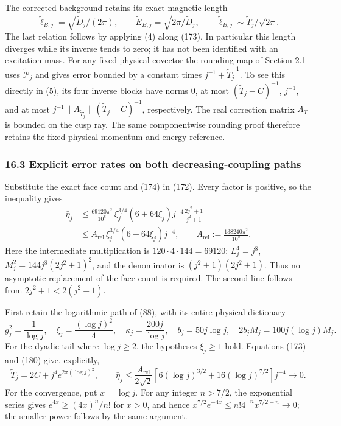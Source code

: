 \documentclass[
  11pt,
]{article}
\begin{document}
The corrected background retains its exact magnetic length \[
 \widetilde\ell_{B,j}=\sqrt{\widetilde D_j/(2\pi)},\qquad
 \widetilde E_{B,j}=\sqrt{2\pi/\widetilde D_j},\qquad
 \widetilde\ell_{B,j}\sim\widetilde T_j/\sqrt{2\pi}.
 \tag{179}
\] The last relation follows by applying (4) along (173). In particular
this length diverges while its inverse tends to zero; it has not been
identified with an excitation mass. For any fixed physical covector the
rounding map of Section 2.1 uses \(\widetilde{\mathcal P}_j\) and gives
error bounded by a constant times \(j^{-1}+\widetilde T_j^{-1}\). To see
this directly in (5), its four inverse blocks have norms \(0\), at most
\((\widetilde T_j-C)^{-1}\), \(j^{-1}\), and at most
\(j^{-1}\|A_{\widetilde T_j}\|(\widetilde T_j-C)^{-1}\), respectively.
The real correction matrix \(A_T\) is bounded on the cusp ray. The same
componentwise rounding proof therefore retains the fixed physical
momentum and energy reference.

\subsubsection{16.3 Explicit error rates on both decreasing-coupling
paths}\label{explicit-error-rates-on-both-decreasing-coupling-paths}

Substitute the exact face count and (174) in (172). Every factor is
positive, so the inequality gives \[
 \begin{split}
 \bar\eta_j
 &\le\frac{69120\pi^2}{10^8}\,
       \xi_j^{3/4}(6+64\xi_j)j^{-4}
       \frac{2j^2+1}{j^2+1}\\
 &\le A_{\mathrm{rel}}\,
       \xi_j^{3/4}(6+64\xi_j)j^{-4},\qquad
 A_{\mathrm{rel}}:=\frac{138240\pi^2}{10^8}.
 \end{split}
 \tag{180}
\] Here the intermediate multiplication is \(120\cdot4\cdot144=69120\):
\(L_j^4=j^8\), \(M_j^2=144j^8(2j^2+1)^2\), and the denominator is
\((j^2+1)(2j^2+1)\). Thus no asymptotic replacement of the face count is
required. The second line follows from \(2j^2+1<2(j^2+1)\).

First retain the logarithmic path of (88), with its entire physical
dictionary \[
 g_j^2=\frac1{\log j},\quad
 \xi_j=\frac{(\log j)^2}{4},\quad
 \kappa_j=\frac{200j}{\log j},\quad b_j=50j\log j,
 \quad 2b_jM_j=100j(\log j)M_j .
 \tag{181}
\] For the dyadic tail where \(\log j\ge2\), the hypotheses
\(\xi_j\ge1\) hold. Equations (173) and (180) give, explicitly, \[
 \widetilde T_j=2C+j^4e^{2\pi(\log j)^2},\qquad
 \bar\eta_j\le\frac{A_{\mathrm{rel}}}{2\sqrt2}
 \left[6(\log j)^{3/2}+16(\log j)^{7/2}\right]j^{-4}
 \longrightarrow0.
 \tag{182}
\] For the convergence, put \(x=\log j\). For any integer \(n>7/2\), the
exponential series gives \(e^{4x}\ge(4x)^n/n!\) for \(x>0\), and hence
\(x^{7/2}e^{-4x}\le n!4^{-n}x^{7/2-n}\to0\); the smaller power follows
by the same argument.
\end{document}
